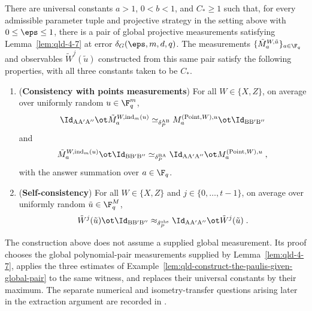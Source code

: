\begin{lemma}\label{lem:qld-construct-the-paulis}
	\leanok
	There are universal constants $a>1$, $0<b<1$, and $C_*\geq1$ such that,
	for every admissible parameter tuple and projective strategy in the setting
	above with $0\leq\eps\leq1$, there is a pair of global projective measurements
	satisfying Lemma~\ref{lem:qld-4-7} at error $\delta_G(\eps,m,d,q)$.
	The measurements $\{\tilde{M}^{W,\tilde{u}}_a\}_{a \in \F_q}$ and observables
	$\tilde{W}^j(\tilde{u})$ constructed from this same pair satisfy the following
	properties, with all three constants taken to be $C_*$.
	\begin{enumerate}
		\item (\textbf{Consistency with points measurements}) For all $W \in \{X,Z\}$, on average over uniformly random $u \in \F_q^m$,
		\[
			\Id_{\mathrm{A}\mathrm{A}'\mathrm{A}''} \ot \tilde{M}^{W,\mathrm{ind}_m(u)}_a \simeq_{\delta_P^{\mathrm{AB}}} M^{(\mathrm{Point},W),u}_a \ot \Id_{\mathrm{B}\mathrm{B}'\mathrm{B}''}
		\]
		and
		\[
			\tilde{M}^{W,\mathrm{ind}_m(u)}_a \ot \Id_{\mathrm{B}\mathrm{B}'\mathrm{B}''} \simeq_{\delta_P^{\mathrm{BA}}} \Id_{\mathrm{A}\mathrm{A}'\mathrm{A}''} \ot M^{(\mathrm{Point},W),u}_a\;,
		\]
		with the answer summation over $a \in \F_q$.
		\item (\textbf{Self-consistency}) For all $W \in \{X,Z\}$ and $j \in \{0,\ldots,t-1\}$, on average over uniformly random $\tilde{u} \in \F_q^{M}$,
		\[
			\tilde{W}^j(\tilde{u}) \ot \Id_{\mathrm{B}\mathrm{B}'\mathrm{B}''} \approx_{\delta_P^{\mathrm{obs}}} \Id_{\mathrm{A}\mathrm{A}'\mathrm{A}''} \ot \tilde{W}^j(\tilde{u})\;.
		\]
	\end{enumerate}
	The construction above does not assume a supplied global measurement. Its
	proof chooses the global polynomial-pair measurements supplied by
	Lemma~\ref{lem:qld-4-7}, applies the three estimates of
	Example~\ref{lem:qld-construct-the-paulis-given-global-pair} to the same
	witness, and replaces their universal constants by their maximum. The
	separate numerical and isometry-transfer questions arising later in the
	extraction argument are recorded in \cite{gap:qpbt_extraction-transfer}.
\end{lemma}
